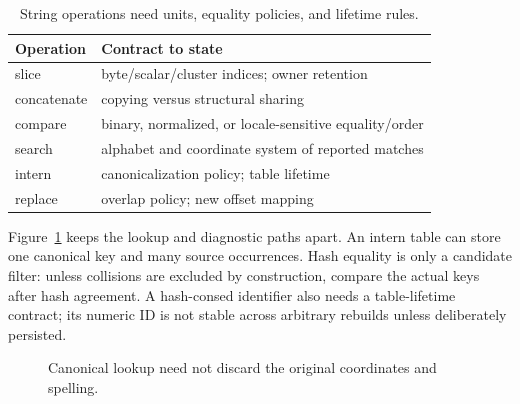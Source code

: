 \begin{table}[htbp]
\caption{String operations need units, equality policies, and lifetime rules.}
\label{tab:ch77-operations}
\centering
\begin{tabular}{ll}
\toprule
Operation & Contract to state \\
\midrule
slice & byte/scalar/cluster indices; owner retention \\
concatenate & copying versus structural sharing \\
compare & binary, normalized, or locale-sensitive equality/order \\
search & alphabet and coordinate system of reported matches \\
intern & canonicalization policy; table lifetime \\
replace & overlap policy; new offset mapping \\
\bottomrule
\end{tabular}
\end{table}

Figure~\ref{fig:ch77-coordinates} keeps the lookup and diagnostic paths apart.
An intern table can store one canonical key and many source occurrences.
Hash equality is only a candidate filter: unless collisions are excluded by construction, compare the actual keys after hash agreement.
A hash-consed identifier also needs a table-lifetime contract; its numeric ID is not stable across arbitrary rebuilds unless deliberately persisted.

\begin{figure}[htbp]
\centering
{}
\caption{Canonical lookup need not discard the original coordinates and spelling.}
\label{fig:ch77-coordinates}
\end{figure}

